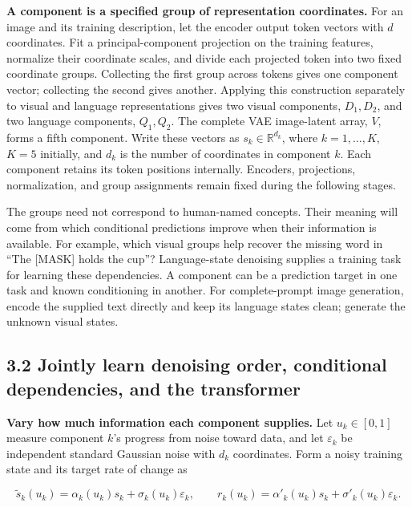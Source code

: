 \documentclass[11pt,letterpaper]{article}
\begin{document}

\textbf{A component is a specified group of representation coordinates.} For an image and its training description, let the encoder output token vectors with \(d\) coordinates. Fit a principal-component projection on the training features, normalize their coordinate scales, and divide each projected token into two fixed coordinate groups. Collecting the first group across tokens gives one component vector; collecting the second gives another. Applying this construction separately to visual and language representations gives two visual components, \(D_1,D_2\), and two language components, \(Q_1,Q_2\). The complete VAE image-latent array, \(V\), forms a fifth component. Write these vectors as \(s_k\in\mathbb R^{d_k}\), where \(k=1,\ldots,K\), \(K=5\) initially, and \(d_k\) is the number of coordinates in component \(k\). Each component retains its token positions internally. Encoders, projections, normalization, and group assignments remain fixed during the following stages.

The groups need not correspond to human-named concepts. Their meaning will come from which conditional predictions improve when their information is available. For example, which visual groups help recover the missing word in ``The {[}MASK{]} holds the cup''? Language-state denoising supplies a training task for learning these dependencies. A component can be a prediction target in one task and known conditioning in another. For complete-prompt image generation, encode the supplied text directly and keep its language states clean; generate the unknown visual states.

\hypertarget{jointly-learn-denoising-order-conditional-dependencies-and-the-transformer}{%
\subsection{3.2 Jointly learn denoising order, conditional dependencies, and the transformer}\label{jointly-learn-denoising-order-conditional-dependencies-and-the-transformer}}

\textbf{Vary how much information each component supplies.} Let \(u_k\in[0,1]\) measure component \(k\)'s progress from noise toward data, and let \(\varepsilon_k\) be independent standard Gaussian noise with \(d_k\) coordinates. Form a noisy training state and its target rate of change as

\[
\widetilde s_k(u_k)=\alpha_k(u_k)s_k+\sigma_k(u_k)\varepsilon_k,
\qquad
r_k(u_k)=\alpha'_k(u_k)s_k+\sigma'_k(u_k)\varepsilon_k.
\]
\end{document}
